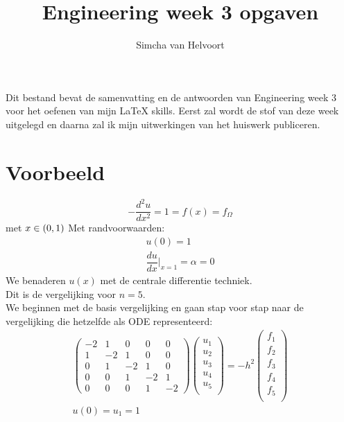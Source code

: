 \documentclass[11pt]{article}
\begin{document}
\title{Engineering week 3 opgaven}
\author{Simcha van Helvoort}
\maketitle

Dit bestand bevat de samenvatting en de antwoorden van Engineering week 3 voor het oefenen van mijn LaTeX skills. Eerst zal wordt de stof van deze week uitgelegd en daarna zal ik mijn uitwerkingen van het huiswerk publiceren.

\newpage

\section{Voorbeeld}

$$-\dfrac{d^2u}{dx^2} = 1 = f(x) = f_{\Omega}$$ met $x \in (0, 1) \\
$
Met randvoorwaarden:
\begin{align*}
    u(0) = 1\\
	\dfrac{du}{dx}\Big|_{x = 1} = \alpha = 0
\end{align*}
We benaderen $u(x)$ met de centrale differentie techniek.\\
Dit is de vergelijking voor $n = 5$.\\
We beginnen met de basis vergelijking en gaan stap voor stap naar de \\vergelijking die hetzelfde als ODE representeerd:\\
\begin{gather*}
\begin{pmatrix}
-2& 1 & 0 & 0 & 0 \\
1 & -2& 1 & 0 & 0 \\
0 & 1 & -2& 1 & 0 \\
0 & 0 & 1 & -2& 1 \\
0 & 0 & 0 & 1& -2 
\end{pmatrix}
%
\begin{pmatrix}
u_{1}\\
u_{2}\\
u_{3}\\
u_{4}\\
u_{5}\\
\end{pmatrix}
=
-h^2
\begin{pmatrix}
f_{1}\\
f_{2}\\
f_{3}\\
f_{4}\\
f_{5}\\
\end{pmatrix}\\
u(0)= u_{1} = 1 
\end{gather*}
\end{document}
